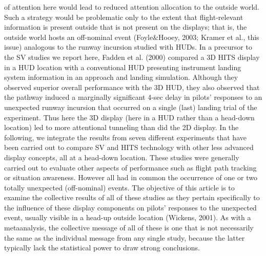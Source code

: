 \documentclass[utf8,bachelor,manualbib]{gradu3}
\begin{document}
of attention here would lead to reduced attention allocation to the outside
world. Such a strategy would be problematic only to the extent that flight-relevant
information is present outside that is not present on the displays; that is, the
outside world hosts an off-nominal event (Foyle\&Hooey, 2003; Kramer et al., this
issue) analogous to the runway incursion studied with HUDs.
In a precursor to the SV studies we report here, Fadden et al. (2000) compared a
3D HITS display in a HUD location with a conventional HUD presenting instrument
landing system information in an approach and landing simulation. Although
they observed superior overall performance with the 3D HUD, they also observed
that the pathway induced a marginally significant 4-sec delay in pilots’ responses
to an unexpected runway incursion that occurred on a single (last) landing trial of
the experiment. Thus here the 3D display (here in a HUD rather than a head-down
location) led to more attentional tunneling than did the 2D display.
In the following, we integrate the results from seven different experiments that
have been carried out to compare SV and HITS technology with other less advanced
display concepts, all at a head-down location. These studies were generally
carried out to evaluate other aspects of performance such as flight path tracking or
situation awareness. However all had in common the occurrence of one or two totally
unexpected (off-nominal) events. The objective of this article is to examine
the collective results of all of these studies as they pertain specifically to the influence
of these display components on pilots’ responses to the unexpected event,
usually visible in a head-up outside location (Wickens, 2001). As with a metaanalysis,
the collective message of all of these is one that is not necessarily the
same as the individual message from any single study, because the latter typically
lack the statistical power to draw strong conclusions. \citep{wickens2009}
\end{document}
